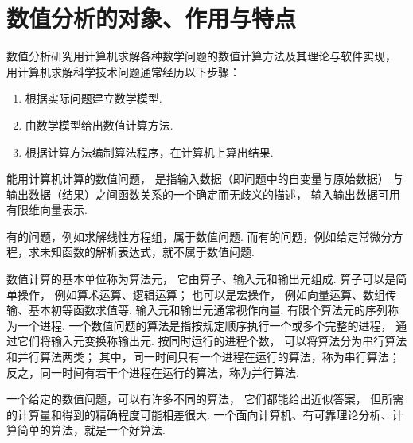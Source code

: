 \section{数值分析的对象、作用与特点}
数值分析研究用计算机求解各种数学问题的数值计算方法及其理论与软件实现，
用计算机求解科学技术问题通常经历以下步骤：
\begin{enumerate}
	\item 根据实际问题建立数学模型.
	\item 由数学模型给出数值计算方法.
	\item 根据计算方法编制算法程序，在计算机上算出结果.
\end{enumerate}

能用计算机计算的数值问题，
是指输入数据（即问题中的自变量与原始数据）
与输出数据（结果）之间函数关系的一个确定而无歧义的描述，
输入输出数据可用有限维向量表示.

有的问题，例如求解线性方程组，属于数值问题.
而有的问题，例如给定常微分方程，求未知函数的解析表达式，就不属于数值问题.

数值计算的基本单位称为算法元，
它由算子、输入元和输出元组成.
算子可以是简单操作，
例如算术运算、逻辑运算；
也可以是宏操作，
例如向量运算、数组传输、基本初等函数求值等.
输入元和输出元通常视作向量.
有限个算法元的序列称为一个进程.
一个数值问题的算法是指按规定顺序执行一个或多个完整的进程，
通过它们将输入元变换称输出元.
按同时运行的进程个数，
可以将算法分为串行算法和并行算法两类；
其中，同一时间只有一个进程在运行的算法，称为串行算法；
反之，同一时间有若干个进程在运行的算法，称为并行算法.

一个给定的数值问题，可以有许多不同的算法，
它们都能给出近似答案，
但所需的计算量和得到的精确程度可能相差很大.
一个面向计算机、有可靠理论分析、计算简单的算法，就是一个好算法.
